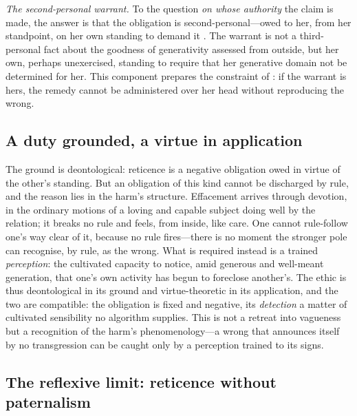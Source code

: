 \emph{The second-personal warrant.} To the question \emph{on whose authority} the claim is made, the answer is that the obligation is second-personal---owed to her, from her standpoint, on her own standing to demand it \parencite{darwall2006}. The warrant is not a third-personal fact about the goodness of generativity assessed from outside, but her own, perhaps unexercised, standing to require that her generative domain not be determined for her. This component prepares the constraint of : if the warrant is hers, the remedy cannot be administered over her head without reproducing the wrong.

\subsection{A duty grounded, a virtue in application}
\label{p18:sub:eth-virtue}

The ground is deontological: reticence is a negative obligation owed in virtue of the other's standing. But an obligation of this kind cannot be discharged by rule, and the reason lies in the harm's structure. Effacement arrives through devotion, in the ordinary motions of a loving and capable subject doing well by the relation; it breaks no rule and feels, from inside, like care. One cannot rule-follow one's way clear of it, because no rule fires---there is no moment the stronger pole can recognise, by rule, as the wrong. What is required instead is a trained \emph{perception}: the cultivated capacity to notice, amid generous and well-meant generation, that one's own activity has begun to foreclose another's. The ethic is thus deontological in its ground and virtue-theoretic in its application, and the two are compatible: the obligation is fixed and negative, its \emph{detection} a matter of cultivated sensibility no algorithm supplies. This is not a retreat into vagueness but a recognition of the harm's phenomenology---a wrong that announces itself by no transgression can be caught only by a perception trained to its signs.

\subsection{The reflexive limit: reticence without paternalism}
\label{p18:sub:eth-paternalism}

